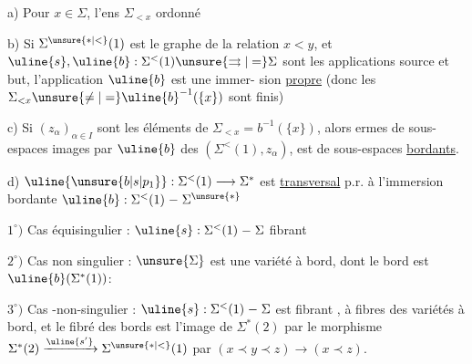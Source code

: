 
a) Pour  $x\in\Sigma$, l'ens $\Sigma_{<x}$ 
 ordonné

b) Si $\Sigma^{\unsure{*|<}}(1)$ est le graphe de la relation
$x<y$, et $\uline{s},\uline{b}:\Sigma^{<}(1)\unsure{\rightrightarrows|=}\Sigma$ sont les applications
source et but,  l'application $\uline{b}$ est une immer-
sion  \uline{propre} (donc les $\Sigma_{<x}\unsure{\ne|=}\uline{b}^{-1}(\{x\})$
sont finis)

c) Si $(z_\alpha)_{\alpha\in I}$ sont les éléments de $\Sigma_{<x}=b^{-1}(\{x\})$,
alors   ermes  de sous-espaces 
images par $\uline{b}$ des  $(\Sigma^{<}(1),z_\alpha)$, est 
de sous-espaces \uline{bordants}.

d) $\uline{\unsure{b|s|p_1}}:\Sigma^{<}(1)\longrightarrow\Sigma^*$ est \uline{transversal} p.r. à l'immersion
bordante $\uline{b}:\Sigma^{<}(1)\mathrel{-}\Sigma^{\unsure{*}}$

$1^{\circ})$ Cas équisingulier : $\uline{s}:\Sigma^{<}(1)\mathrel{-}\Sigma$ fibrant 

$2^{\circ})$ Cas non singulier : $\unsure{\Sigma}$ est une variété à bord,
dont le bord est $\uline{b}(\Sigma^{*}(1))$:

$3^{\circ})$ Cas -non-singulier : $\uline{s}:\Sigma^{<}(1)\mathrel{-}\Sigma$ est
fibrant , à fibres des variétés à bord, et le
fibré des bords est l'image de $\Sigma^{*}(2)$ par
le morphisme $\Sigma^{*}(2)\xrightarrow{\uline{s'}}\Sigma^{\unsure{*|<}}(1)$ 
par $(x\prec y\prec z)\longrightarrow(x\prec z)$.
